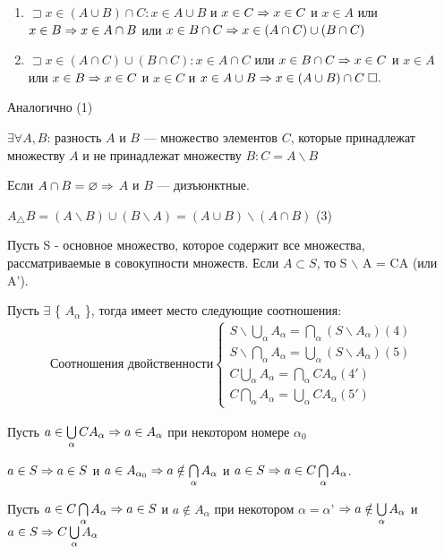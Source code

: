 \documentclass{article}
\begin{document}
\begin{enumerate}
	\item $\sqsupset x \in (A \cup B) \cap C: x \in A \cup B$ и $x \in C \Rightarrow x \in C$ и $x \in A$ или $x \in B \Rightarrow x \in A \cap B$ или $x \in B \cap C \Rightarrow x \in (A \cap C) \cup (B \cap C)$

	\item $\sqsupset x \in (A \cap C) \cup (B \cap C): x \in A \cap C$ или $x \in B \cap C \Rightarrow x \in C$ и $x \in A$ или $x \in B \Rightarrow x \in C$ и $x \in C$ и $x \in A \cup B \Rightarrow x \in (A \cup B) \cap C \;\square.$
\end{enumerate}

\proof {}

Аналогично (1)


$\exists \forall A, B$: разность $A$ и $B$ --- множество элементов $C$, которые принадлежат множеству $A$ и не принадлежат множеству $B: C = A \backslash B$


Если $A \cap B = \varnothing \Rightarrow$ $A$ и $B$ --- дизъюнктные.

$A_{\triangle} B = (A \backslash B) \cup (B \backslash A) = (A \cup B) \backslash (A \cap B)$  (3)

Пусть S - основное множество, которое содержит все множества, рассматриваемые в совокупности множеств. Если $A \subset S$, то S $\backslash$ A = CA (или A').

Пусть $\exists$ \{ $A_{\alpha}$ \}, тогда имеет место следующие соотношения:
\begin{align*}
	\text{Соотношения двойственности}
	\begin{cases}
		S \backslash \bigcup\limits_{\alpha} A_\alpha = \bigcap\limits_{\alpha} (S \backslash A_{\alpha})  (4) \\
		S \backslash \bigcap\limits_{\alpha} A_\alpha = \bigcup\limits_{\alpha} (S \backslash A_{\alpha})  (5) \\
		C \bigcup\limits_{\alpha} A_\alpha = \bigcap\limits_{\alpha} C A_{\alpha}   (4')                       \\
		C \bigcap\limits_{\alpha} A_\alpha = \bigcup\limits_{\alpha} C A_{\alpha}   (5')
	\end{cases}
\end{align*}

Пусть $a \in \bigcup\limits_{\alpha} C A_{\alpha} \Rightarrow a \in A_{\alpha}$ при некотором номере $\alpha_{0}$

$a \in S \Rightarrow a \in S$ и $a \in A_{\alpha_{0}} \Rightarrow a \notin \bigcap\limits_{\alpha} A_{\alpha}$ и $a \in S \Rightarrow a \in C \bigcap\limits_{\alpha} A_{\alpha}$.

Пусть $a \in C \bigcap\limits_{\alpha} A_{\alpha} \Rightarrow a \in S$ и $a \notin A_{\alpha}$ при некотором $\alpha = \alpha$' $\Rightarrow a \notin \bigcup\limits_{\alpha} A_{\alpha}$ и $a \in S \Rightarrow C \bigcup\limits_{\alpha} A_{\alpha}$
\end{document}
